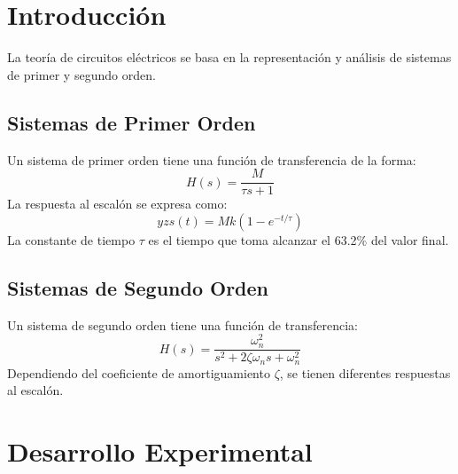 \documentclass[10pt,openany]{book}
\begin{document}


\tableofcontents

\newpage

\section*{Introducción}
La teoría de circuitos eléctricos se basa en la representación y análisis de sistemas de primer y segundo orden. 

\subsection*{Sistemas de Primer Orden}
Un sistema de primer orden tiene una función de transferencia de la forma:
\begin{equation}
    H(s) = \frac{M}{\tau s + 1}
\end{equation}
La respuesta al escalón se expresa como:
\begin{equation}
    yzs(t) = M k \left(1 - e^{-t/\tau} \right)
\end{equation}
La constante de tiempo $\tau$ es el tiempo que toma alcanzar el 63.2\% del valor final.

\subsection*{Sistemas de Segundo Orden}
Un sistema de segundo orden tiene una función de transferencia:
\begin{equation}
    H(s) = \frac{\omega_n^2}{s^2 + 2\zeta \omega_n s + \omega_n^2}
\end{equation}
Dependiendo del coeficiente de amortiguamiento $\zeta$, se tienen diferentes respuestas al escalón.

\section*{Desarrollo Experimental}
\end{document}
